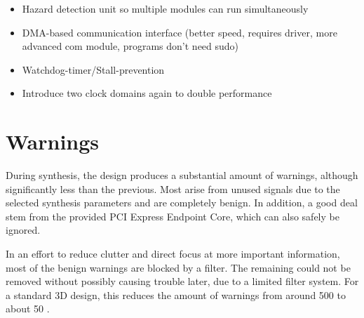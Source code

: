 \begin{itemize}
    \item Hazard detection unit so multiple modules can run simultaneously
    \item DMA-based communication interface (better speed, requires driver, more advanced com module, programs don't need sudo)
    \item Watchdog-timer/Stall-prevention
    \item Introduce two clock domains again to double performance
\end{itemize}


\section{Warnings}

During synthesis, the design produces a substantial amount of warnings, although significantly less than the previous.
Most arise from unused signals due to the selected synthesis parameters and are completely benign.
In addition, a good deal stem from the provided PCI Express Endpoint Core, which can also safely be ignored.

In an effort to reduce clutter and direct focus at more important information, most of the benign warnings are blocked by a filter.
The remaining could not be removed without possibly causing trouble later, due to a limited filter system.
For a standard 3D design, this reduces the amount of warnings from around 500 to about 50 \footnotemark.

